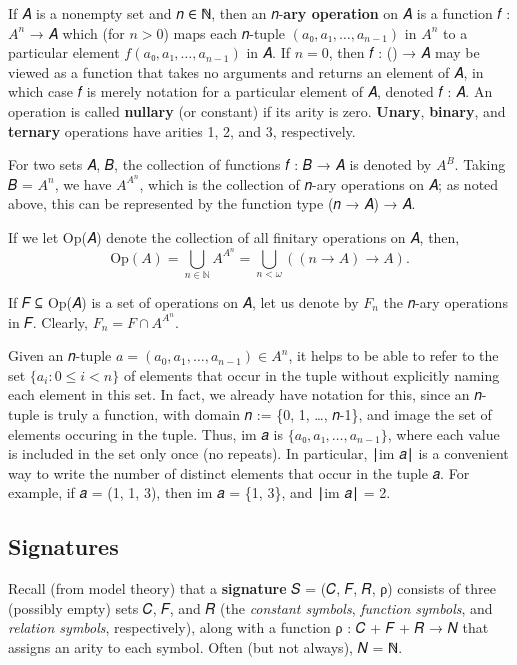 \documentclass[sigplan,screen]{acmart}
\begin{document}
If 𝐴 is a nonempty set and 𝑛 ∈ ℕ, then an 𝑛-\textbf{ary operation} on 𝐴 is a function 𝑓 : \ensuremath{𝐴^n} → 𝐴 which (for \(𝑛 > 0\)) maps each 𝑛-tuple \((𝑎₀, 𝑎₁, …, 𝑎_{n-1})\) in \ensuremath{𝐴^n} to a particular element \(𝑓(𝑎₀, 𝑎₁, …, 𝑎_{n-1})\) in 𝐴. If \(𝑛 = 0\), then 𝑓 : () → 𝐴 may be viewed as a function that takes no arguments and returns an element of 𝐴, in which case 𝑓 is merely notation for a particular element of 𝐴, denoted 𝑓 : 𝐴.
An operation is called \textbf{nullary} (or constant) if its arity is zero. \textbf{Unary}, \textbf{binary}, and \textbf{ternary} operations have arities 1, 2, and 3, respectively.

For two sets 𝐴, 𝐵, the collection of functions 𝑓 : 𝐵 → 𝐴 is denoted by \(A^B\). Taking 𝐵 = \ensuremath{𝐴^n}, we have \(A^{A^n}\), which is the collection of 𝑛-ary operations on 𝐴; as noted above, this can be represented by the function type (𝑛 → 𝐴) → 𝐴.

If we let Op(𝐴) denote the collection of all finitary operations on 𝐴, then,
\[\mathrm{Op}(𝐴) = ⋃_{n ∈ ℕ} A^{A^n} = ⋃_{n<ω} ((𝑛 → A) → A).\]

If 𝐹 ⊆ Op(𝐴) is a set of operations on 𝐴, let us denote by \(𝐹_n\) the 𝑛-ary operations in 𝐹. Clearly, \(F_n = F ∩ A^{A^n}\).

Given an 𝑛-tuple \(a = (a_0, a_1, \dots, a_{n-1}) ∈ A^n\), it helps to be able to refer to the set \(\{a_i : 0 ≤ i < n\}\) of elements that occur in the tuple without explicitly naming each element in this set. In fact, we already have notation for this, since an 𝑛-tuple is truly a function, with domain 𝑛 := \{0, 1, …, 𝑛-1\}, and image the set of
elements occuring in the tuple. Thus, im 𝑎 is \(\{𝑎₀, 𝑎₁, …, 𝑎_{n-1}\}\), where each value is included in the set only once (no repeats). In particular, ∣im 𝑎∣ is a convenient way to write the number of distinct elements that occur in the tuple 𝑎. For example, if 𝑎 = (1, 1, 3), then im 𝑎 = \{1, 3\}, and ∣im 𝑎∣ = 2.

\subsection{Signatures}\label{signatures}
Recall (from model theory) that a \textbf{signature} 𝑆 = (𝐶, 𝐹, 𝑅, ρ) consists of three (possibly empty) sets 𝐶, 𝐹, and 𝑅 (the \emph{constant symbols}, \emph{function symbols}, and \emph{relation symbols}, respectively), along with a function ρ : 𝐶 + 𝐹 + 𝑅 → 𝑁 that assigns an arity to each symbol. Often (but not always), 𝑁 = ℕ.
\end{document}
